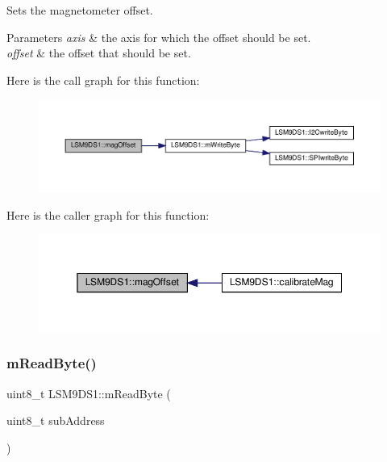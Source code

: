 Sets the magnetometer offset. 


\begin{DoxyParams}{Parameters}
{\em axis} & the axis for which the offset should be set. \\
\hline
{\em offset} & the offset that should be set. \\
\hline
\end{DoxyParams}
Here is the call graph for this function\+:\nopagebreak
\begin{figure}[H]
\begin{center}
\leavevmode
\includegraphics[width=350pt]{classLSM9DS1_a0d461614bd058b082c94481dc916c18b_cgraph}
\end{center}
\end{figure}
Here is the caller graph for this function\+:\nopagebreak
\begin{figure}[H]
\begin{center}
\leavevmode
\includegraphics[width=350pt]{classLSM9DS1_a0d461614bd058b082c94481dc916c18b_icgraph}
\end{center}
\end{figure}
\mbox{\label{classLSM9DS1_ae4e470321567e4f93fc09f4cc6cd9efa}} 
\subsubsection{\texorpdfstring{m\+Read\+Byte()}{mReadByte()}}
{\footnotesize\ttfamily uint8\+\_\+t L\+S\+M9\+D\+S1\+::m\+Read\+Byte (\begin{DoxyParamCaption}\item[{uint8\+\_\+t}]{sub\+Address }\end{DoxyParamCaption})\hspace{0.3cm}{\ttfamily [protected]}}




